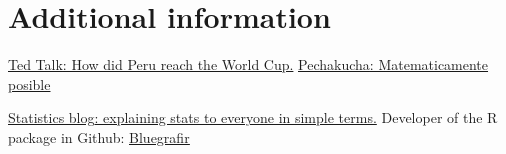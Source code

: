 \documentclass[10pt,a4paper,sans, unicode]{moderncv} %
\begin{document}
\section{Additional information}
\begin{small}

 {\href{https://www.youtube.com/watch?v=w2bFtUVihrs}{\underline{Ted Talk}: How did Peru reach the World Cup.}
{\href{https://www.youtube.com/watch?v=kC85LBaDUZo&t=1s}{\underline{Pechakucha}: Matematicamente posible}}}


 {\href{https://statssos.net}{\underline{Statistics blog}: explaining stats to everyone in simple terms.}
Developer of the R package in Github:  {\href{https://github.com/jsaraviadrago/bluegrafir}{\underline{Bluegrafir}}}}



\end{small}



\end{document}
